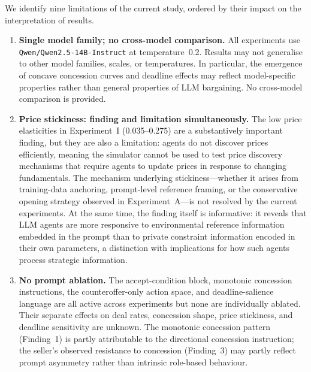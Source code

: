 We identify nine limitations of the current study, ordered by their impact on the interpretation of results.

\begin{enumerate}
    \item \textbf{Single model family; no cross-model comparison.}  All experiments use \texttt{Qwen/Qwen2.5-14B-Instruct} at temperature~0.2.  Results may not generalise to other model families, scales, or temperatures.  In particular, the emergence of concave concession curves and deadline effects may reflect model-specific properties rather than general properties of LLM bargaining.  No cross-model comparison is provided.

    \item \textbf{Price stickiness: finding and limitation simultaneously.}  The low price elasticities in Experiment~I (0.035--0.275) are a substantively important finding, but they are also a limitation: agents do not discover prices efficiently, meaning the simulator cannot be used to test price discovery mechanisms that require agents to update prices in response to changing fundamentals.  The mechanism underlying stickiness---whether it arises from training-data anchoring, prompt-level reference framing, or the conservative opening strategy observed in Experiment~A---is not resolved by the current experiments.  At the same time, the finding itself is informative: it reveals that LLM agents are more responsive to environmental reference information embedded in the prompt than to private constraint information encoded in their own parameters, a distinction with implications for how such agents process strategic information.

    \item \textbf{No prompt ablation.}  The accept-condition block, monotonic concession instructions, the counteroffer-only action space, and deadline-salience language are all active across experiments but none are individually ablated.  Their separate effects on deal rates, concession shape, price stickiness, and deadline sensitivity are unknown.  The monotonic concession pattern (Finding~1) is partly attributable to the directional concession instruction; the seller's observed resistance to concession (Finding~3) may partly reflect prompt asymmetry rather than intrinsic role-based behaviour.


\end{enumerate}
